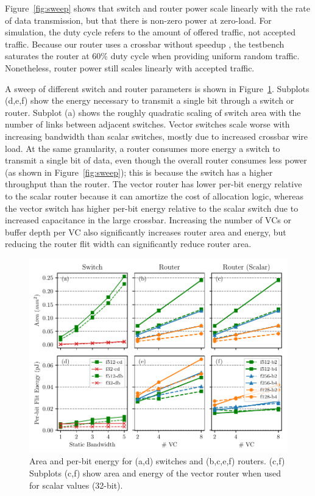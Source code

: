 Figure~\ref{fig:sweep} shows that switch and router power scale linearly with the rate of data transmission, but that there is non-zero power at zero-load. 
For simulation, the duty cycle refers to the amount of offered traffic, not accepted traffic.
Because our router uses a crossbar without speedup \cite{dallytowles}, the testbench saturates the router at 60\% duty cycle when providing uniform random traffic. 
Nonetheless, router power still scales linearly with accepted traffic.

A sweep of different switch and router parameters is shown in Figure~\ref{fig:char}. Subplots (d,e,f) show the energy necessary to transmit a single bit through a switch or router.
Subplot (a) shows the roughly quadratic scaling of switch area with the number of links between adjacent switches.
Vector switches scale worse with increasing bandwidth than scalar switches, mostly due to increased crossbar wire load. 
At the same granularity, a router consumes more energy a switch to transmit a single bit of data, even though the overall router consumes less power (as shown in Figure~\ref{fig:sweep}); 
this is because the switch has a higher throughput than the router.
The vector router has lower per-bit energy relative to the scalar router because it can amortize the cost of allocation logic, whereas the vector switch has higher per-bit energy relative to the scalar switch due to increased capacitance in the large crossbar. 
Increasing the number of VCs or buffer depth per VC also significantly increases router area and energy, but reducing the router flit width can significantly reduce router area. 

\begin{figure}
\centering
\includegraphics[width=1\columnwidth]{figs/char.pdf}
  \caption{Area and per-bit energy for (a,d) switches and (b,c,e,f) routers. 
  (c,f) Subplots (c,f) show area and energy of the vector router when used for scalar values (32-bit).}\label{fig:char}
\end{figure}

